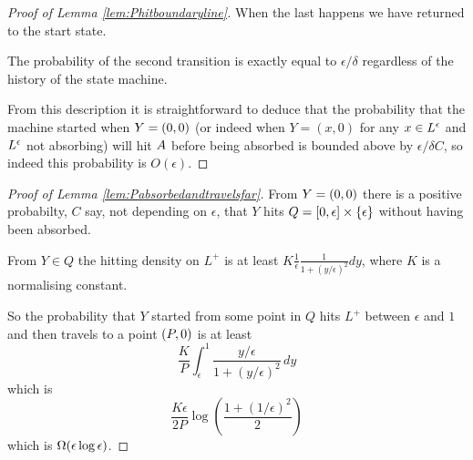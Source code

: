 {\begin{proof}[Proof of Lemma \ref{lem:Phitboundaryline}]
When the last happens we have returned to the start state.

The probability of the second transition is exactly equal to
$\epsilon/\delta$ regardless of the history of the state machine.

From this description it is straightforward to deduce that the
probability that the machine started when $Y = (0,0)$ (or indeed when
$Y = (x, 0)$ for any $x \in L^\epsilon$ and $L^\epsilon$ not absorbing) will hit
$A$ before being absorbed is
bounded above by $\epsilon/\delta C$, so indeed this probability is
$O(\epsilon)$.
\end{proof}

\begin{proof}[Proof of Lemma \ref{lem:Pabsorbedandtravelsfar}]
From $Y = (0,0)$ there is a positive probabilty, $C$ say, not
depending on $\epsilon$, that $Y$ hits $Q = [0, \epsilon] \times
\{\epsilon\}$ without having been absorbed.

From $Y \in Q$ the hitting density on $L^+$ is at least $K
\frac{1}{\epsilon} \frac{1}{1 + (y/\epsilon)^2} dy$, where $K$ is a
normalising constant.

So the probability that $Y$ started from some point in $Q$ hits $L^+$
between $\epsilon$ and $1$ and then travels to a point $(P,0)$ is at least
\[
\frac{K}{P} \int_{\epsilon}^{1} \frac{y/\epsilon}{1 + (y/\epsilon)^2}
\, dy
\]
which is
\[
\frac{K\epsilon}{2P} \log\left(\frac{1 + (1/\epsilon)^2}{2}\right)
\]
which is $\Omega(\epsilon\log\epsilon)$.
\end{proof}
}
